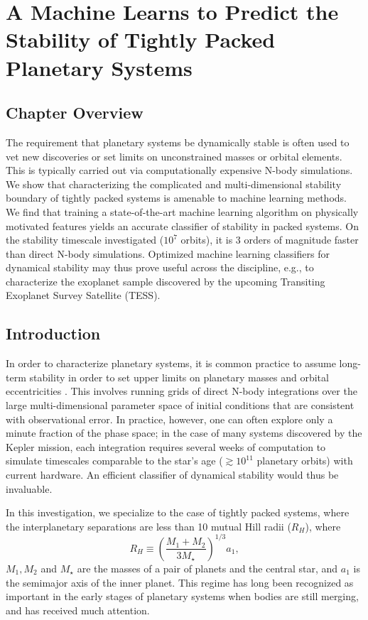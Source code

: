 \chapter[Stability of Planetary Systems]{A Machine Learns to Predict the Stability of Tightly Packed Planetary Systems}
\label{chap:Stability}

\section{Chapter Overview}

The requirement that planetary systems be dynamically stable is often used to vet new discoveries or set limits on unconstrained masses or orbital elements. 
This is typically carried out via computationally expensive N-body simulations.
We show that characterizing the complicated and multi-dimensional stability boundary of tightly packed systems is amenable to machine learning methods. 
We find that training a state-of-the-art machine learning algorithm on physically motivated features yields an accurate classifier of stability in packed systems. 
On the stability timescale investigated ($10^7$ orbits), it is 3 orders of magnitude faster than direct N-body simulations. 
Optimized machine learning classifiers for dynamical stability may thus prove useful across the discipline, e.g., to characterize the exoplanet sample discovered by the upcoming Transiting Exoplanet Survey Satellite (TESS).

\section{Introduction}
In order to characterize planetary systems, it is common practice to assume long-term stability in order to set upper limits on planetary masses and orbital eccentricities \citep[e.g.][]{Lissauer2011, Steffen2013, Tamayo14b, Tamayo2015}.
This involves running grids of direct N-body integrations over the large multi-dimensional parameter space of initial conditions that are consistent with observational error.
In practice, however, one can often explore only a minute fraction of the phase space; in the case of many systems discovered by the Kepler mission, each integration requires several weeks of computation to simulate timescales comparable to the star's age ($\gtrsim 10^{11}$ planetary orbits) with current hardware.
An efficient classifier of dynamical stability would thus be invaluable.

In this investigation, we specialize to the case of tightly packed systems, where the interplanetary separations are less than 10 mutual Hill radii ($R_H$), where
\begin{equation}
R_H \equiv \left(\frac{M_1+M_2}{3M_\star} \right)^{1/3} a_1,
\end{equation}
$M_1, M_2$ and $M_\star$ are the masses of a pair of planets and the central star, and $a_1$ is the semimajor axis of the inner planet.
This regime has long been recognized as important in the early stages of planetary systems when bodies are still merging, and has received much attention.

